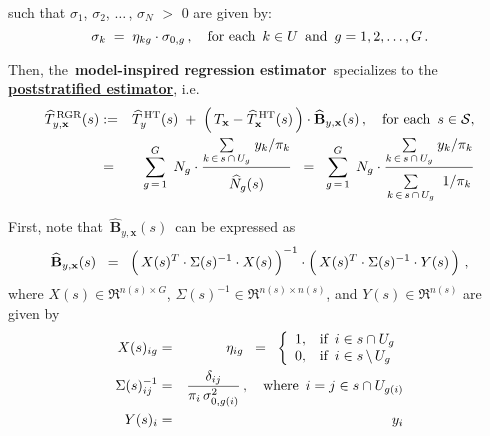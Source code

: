 \begin{example}
\begin{enumerate}
	such that
	$\sigma_{1}$, $\sigma_{2}$, $\ldots$\,, $\sigma_{N}$ $>$ $0$ are given by:
	\begin{equation*}
	\sigma_{k} \; = \; \eta_{kg}\cdot\sigma_{0,g}\,,
	\quad\textnormal{for each \,$k \in U$\, and \,$g = 1,2,\ldots,G$}\,.
	\end{equation*}
\end{enumerate}
Then, the \,\textbf{model-inspired regression estimator}\,
specializes to the \,\underline{\textbf{poststratified estimator}}, i.e.
\begin{eqnarray*}
\widehat{T}^{\,\textnormal{RGR}}_{y,\mathbf{x}}(s)
& := &
	\widehat{T}^{\,\textnormal{HT}}_{y}(s)
	\; + \;
	\left(\,T_{\mathbf{x}} - \widehat{T}^{\,\textnormal{HT}}_{\mathbf{x}}(s) \,\right)
	\cdot
	\widehat{\mathbf{B}}_{y,\mathbf{x}}(s)\,,
	\quad\textnormal{for each \,$s \in \mathcal{S}$},
\\
& = &
	\overset{G}{\underset{g\,=\,1}{\sum}}\;\, N_{g}
	\cdot
	\dfrac{
		\underset{k\,\in\,s\,\cap\,U_{g}}{\sum}\;y_{k}/\pi_{k}
		}{
		\overset{{\color{white}.}}{\widehat{N}_{g}(s)}
		}
\;\; = \;\;
	\overset{G}{\underset{g\,=\,1}{\sum}}\;\, N_{g}
	\cdot
	\dfrac{
		\underset{k\,\in\,s\,\cap\,U_{g}}{\sum}\;y_{k}/\pi_{k}
		}{
		\underset{k\,\in\,s\,\cap\,U_{g}}{\overset{{\color{white}.}}{\sum}}\;\;1/\pi_{k}
		}
\end{eqnarray*}
\end{example}
\proof
First, note that \,$\widehat{\mathbf{B}}_{y,\mathbf{x}}(s)$\, can be expressed as
\begin{equation*}
\widehat{\mathbf{B}}_{y,\mathbf{x}}(s)
\;\; = \;\;
	\left(\,X(s)^{T} \overset{{\color{white}!}}{\cdot} \Sigma(s)^{-1} \cdot X(s)\,\right)^{-1}
	\cdot
	\left(\,X(s)^{T} \overset{{\color{white}!}}{\cdot} \Sigma(s)^{-1} \cdot Y(s) \,\right)\,,
\end{equation*}
where $X(s) \in \Re^{n(s) \times G}$, $\Sigma(s)^{-1} \in \Re^{n(s) \times n(s)}$, and $Y(s) \in \Re^{n(s)}$
are given by
\begin{eqnarray*}
X(s)_{ig}
& = &
	\eta_{ig}
\;\; = \;\;
	\left\{\begin{array}{cl}
		1, &  \textnormal{if \,$i \in s \cap U_{g}$}
		\\
		0, & \textnormal{if \,$i \in s\,\backslash\,U_{g}$}
	\end{array}\right.
\\
\Sigma(s)^{-1}_{ij}
& = &
	\dfrac{\delta_{ij}}{\pi_{i}\,\sigma^{2}_{0,g(i)}}\,,
	\quad
	\textnormal{where \,$i = j \in s \cap U_{g(i)}$}
\\
Y(s)_{i}
& = &
	y_{i}
\end{eqnarray*}
